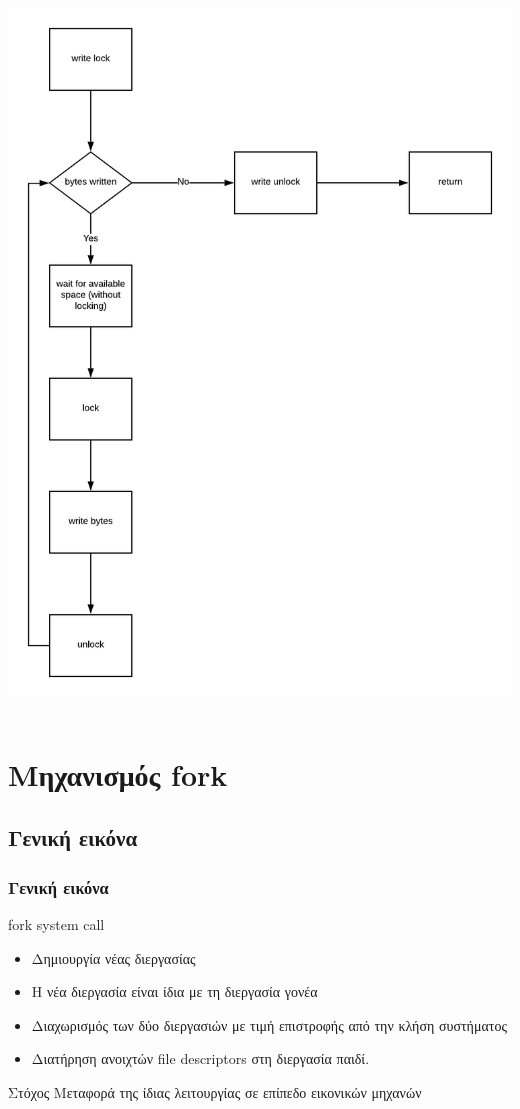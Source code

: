\documentclass[red,slidestop,notes,compress,mathserif]{beamer}
\begin{document}
\begin{frame}
\begin{columns}
\includegraphics[scale=0.4]{figures/pipe_write.png}
\end{columns}
\end{frame}

\section{Μηχανισμός fork}
\subsection{Γενική εικόνα}
\begin{frame}
\frametitle{Γενική εικόνα}
\begin{block}{fork system call}
\begin{itemize}
\item Δημιουργία νέας διεργασίας
\item Η νέα διεργασία είναι ίδια με τη διεργασία γονέα
\item Διαχωρισμός των δύο διεργασιών με τιμή επιστροφής από την κλήση συστήματος
\item Διατήρηση ανοιχτών file descriptors στη διεργασία παιδί.
\end{itemize}
\end{block}
\pause
\begin{block}{Στόχος}
Μεταφορά της ίδιας λειτουργίας σε επίπεδο εικονικών μηχανών
\end{block}
\end{frame}
\end{document}
